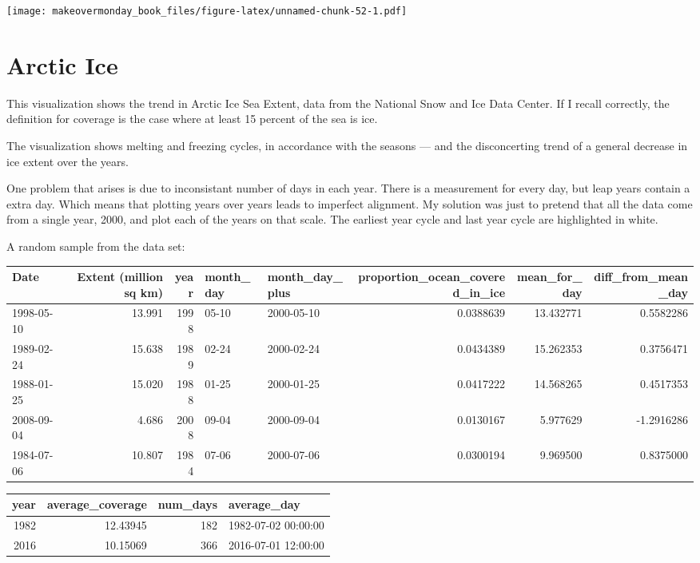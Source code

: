 \documentclass[]{book}
\theoremstyle{definition}
\theoremstyle{definition}
\theoremstyle{definition}
\theoremstyle{remark}
\begin{document}
\texttt{[image: makeovermonday\_book\_files/figure-latex/unnamed-chunk-52-1.pdf]}

\chapter{Arctic Ice}\label{arctic-ice}

This visualization shows the trend in Arctic Ice Sea Extent, data from
the National Snow and Ice Data Center. If I recall correctly, the
definition for coverage is the case where at least 15 percent of the sea
is ice.

The visualization shows melting and freezing cycles, in accordance with
the seasons --- and the disconcerting trend of a general decrease in ice
extent over the years.

One problem that arises is due to inconsistant number of days in each
year. There is a measurement for every day, but leap years contain a
extra day. Which means that plotting years over years leads to imperfect
alignment. My solution was just to pretend that all the data come from a
single year, 2000, and plot each of the years on that scale. The
earliest year cycle and last year cycle are highlighted in white.

A random sample from the data set:

\begin{tabular}{l|r|r|l|l|r|r|r}
\hline
Date & Extent (million sq km) & year & month\_day & month\_day\_plus & proportion\_ocean\_covered\_in\_ice & mean\_for\_day & diff\_from\_mean\_day\\
\hline
1998-05-10 & 13.991 & 1998 & 05-10 & 2000-05-10 & 0.0388639 & 13.432771 & 0.5582286\\
\hline
1989-02-24 & 15.638 & 1989 & 02-24 & 2000-02-24 & 0.0434389 & 15.262353 & 0.3756471\\
\hline
1988-01-25 & 15.020 & 1988 & 01-25 & 2000-01-25 & 0.0417222 & 14.568265 & 0.4517353\\
\hline
2008-09-04 & 4.686 & 2008 & 09-04 & 2000-09-04 & 0.0130167 & 5.977629 & -1.2916286\\
\hline
1984-07-06 & 10.807 & 1984 & 07-06 & 2000-07-06 & 0.0300194 & 9.969500 & 0.8375000\\
\hline
\end{tabular}

\begin{tabular}{r|r|r|l}
\hline
year & average\_coverage & num\_days & average\_day\\
\hline
1982 & 12.43945 & 182 & 1982-07-02 00:00:00\\
\hline
2016 & 10.15069 & 366 & 2016-07-01 12:00:00\\
\hline
\end{tabular}
\end{document}
